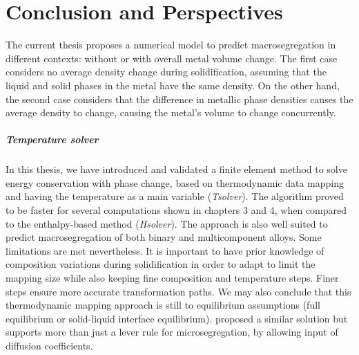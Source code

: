 \chapter*{Conclusion and Perspectives}


The current thesis proposes a numerical model to predict macrosegregation in different contexts: without or
with overall metal volume change. The first case considers no average density change during solidification, 
assuming that the liquid and solid phases in the metal have the same density. 
On the other hand, the second case considers that the difference in metallic phase densities causes the average density to change, causing the metal's volume to
change concurrently. 

\paragraph{Temperature solver}
In this thesis, we have introduced and validated a finite element method to solve energy conservation with phase change, based 
on thermodynamic data mapping and having the temperature as a main variable (\emph{Tsolver}). The algorithm proved to be faster for several computations
shown in chapters 3 and 4, when compared to the enthalpy-based method (\emph{Hsolver}). The approach is also well suited to predict macrosegregation
of both binary and multicomponent alloys. Some limitations are met nevertheless. It is important to have prior knowledge of composition variations
during solidification in order to adapt to limit the mapping size while also keeping fine composition and temperature steps.
Finer steps ensure more accurate transformation paths. We may also conclude that this thermodynamic mapping approach is still
to equilibrium assumptions (full equilibrium or solid-liquid interface equilibrium). \citet{tourret_multiple_2011} proposed
a similar solution but supports more than just a lever rule for microsegregation, by allowing input of diffusion coefficients.

